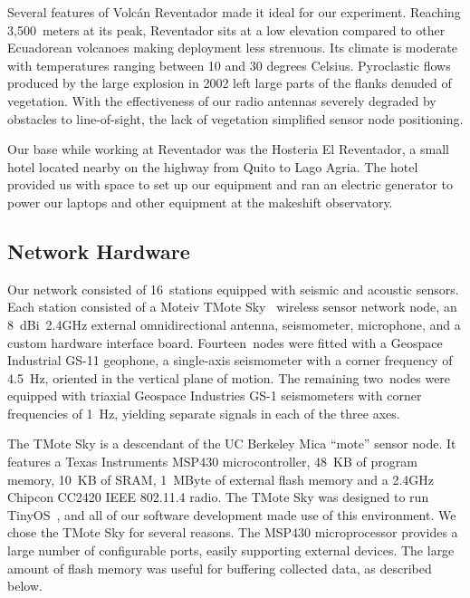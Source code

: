 Several features of Volc\'{a}n Reventador made it ideal for our
experiment.  Reaching 3,500~meters at its peak, Reventador sits at a
low elevation compared to other Ecuadorean volcanoes making deployment
less strenuous.  Its climate is moderate with temperatures ranging
between 10 and 30 degrees Celsius.  Pyroclastic flows produced by the
large explosion in 2002 left large parts of the flanks denuded of
vegetation.  With the effectiveness of our radio antennas severely
degraded by obstacles to line-of-sight, the lack of vegetation
simplified sensor node positioning.

Our base while working at Reventador was the Hosteria El Reventador, a small
hotel located nearby on the highway from Quito to Lago Agria.  The hotel
provided us with space to set up our equipment and ran an electric generator
to power our laptops and other equipment at the makeshift observatory.

\subsection{Network Hardware}

Our network consisted of 16~stations equipped with seismic and acoustic
sensors.  Each station consisted of a Moteiv TMote Sky~\cite{moteiv} wireless
sensor network node, an 8~dBi~2.4GHz external omnidirectional antenna,
seismometer, microphone, and a custom hardware interface board.
Fourteen~nodes were fitted with a Geospace Industrial GS-11 geophone, a
single-axis seismometer with a corner frequency of 4.5~Hz, oriented in the
vertical plane of motion.  The remaining two~nodes were equipped with
triaxial Geospace Industries GS-1 seismometers with corner frequencies of
1~Hz, yielding separate signals in each of the three axes.

The TMote Sky is a descendant of the UC Berkeley Mica ``mote'' sensor node.
It features a Texas Instruments MSP430 microcontroller, 48~KB of program
memory, 10~KB of SRAM, 1~MByte of external flash memory and a 2.4GHz Chipcon
CC2420 IEEE 802.11.4 radio.  The TMote Sky was designed to run
TinyOS~\cite{tinyos-asplos00}, and all of our software development made use
of this environment.  We chose the TMote Sky for several reasons.  The MSP430
microprocessor provides a large number of configurable ports, easily
supporting external devices.  The large amount of flash memory was useful for
buffering collected data, as described below.

